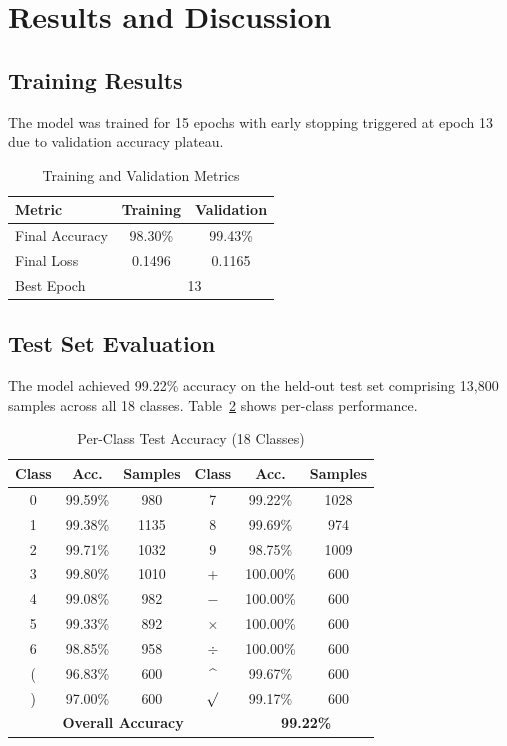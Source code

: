 \documentclass[conference]{IEEEtran}
\begin{document}
\section{Results and Discussion}

\subsection{Training Results}

The model was trained for 15 epochs with early stopping triggered at epoch 13 due to validation accuracy plateau.

\begin{table}[htbp]
\caption{Training and Validation Metrics}
\label{tab:training_metrics}
\centering
\begin{tabular}{|l|c|c|}
\hline
\textbf{Metric} & \textbf{Training} & \textbf{Validation} \\
\hline
Final Accuracy & 98.30\% & 99.43\% \\
Final Loss & 0.1496 & 0.1165 \\
Best Epoch & \multicolumn{2}{c|}{13} \\
\hline
\end{tabular}
\end{table}

\subsection{Test Set Evaluation}

The model achieved 99.22\% accuracy on the held-out test set comprising 13,800 samples across all 18 classes. Table~\ref{tab:per_class} shows per-class performance.

\begin{table}[htbp]
\caption{Per-Class Test Accuracy (18 Classes)}
\label{tab:per_class}
\centering
\begin{tabular}{|c|c|c||c|c|c|}
\hline
\textbf{Class} & \textbf{Acc.} & \textbf{Samples} & \textbf{Class} & \textbf{Acc.} & \textbf{Samples} \\
\hline
0 & 99.59\% & 980 & 7 & 99.22\% & 1028 \\
1 & 99.38\% & 1135 & 8 & 99.69\% & 974 \\
2 & 99.71\% & 1032 & 9 & 98.75\% & 1009 \\
3 & 99.80\% & 1010 & + & 100.00\% & 600 \\
4 & 99.08\% & 982 & $-$ & 100.00\% & 600 \\
5 & 99.33\% & 892 & $\times$ & 100.00\% & 600 \\
6 & 98.85\% & 958 & $\div$ & 100.00\% & 600 \\
\hline
( & 96.83\% & 600 & \^{} & 99.67\% & 600 \\
) & 97.00\% & 600 & $\surd$ & 99.17\% & 600 \\
\hline
\multicolumn{4}{|c|}{\textbf{Overall Accuracy}} & \multicolumn{2}{c|}{\textbf{99.22\%}} \\
\hline
\end{tabular}
\end{table}
\end{document}
